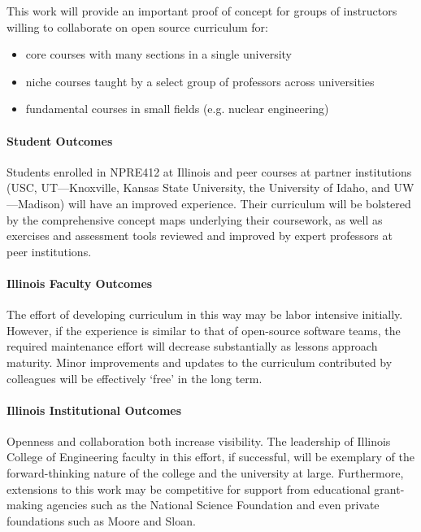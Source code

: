 \documentclass[11pt]{article}
\begin{document}
          This work will provide an important proof of concept for groups of 
          instructors willing to collaborate on open source curriculum for:
          \begin{itemize}
                  \item core courses with many sections in a single university
                  \item niche courses taught by a select group of professors across 
          universities
                  \item fundamental courses in small fields (e.g. nuclear engineering)
          \end{itemize}

          \paragraph{Student Outcomes}
          Students enrolled in NPRE412 at Illinois and peer courses at partner 
          institutions (USC, UT---Knoxville, Kansas State University, the 
          University of Idaho, and UW---Madison) will have an improved 
          experience. Their 
          curriculum will be bolstered by the comprehensive concept maps 
          underlying their coursework\cite{novak_concept_1990}, as well as exercises 
          and assessment tools reviewed and improved by expert professors at 
          peer institutions. 

          \paragraph{Illinois Faculty Outcomes}
          The effort of developing curriculum in this way may be labor 
          intensive initially. However, if the experience is similar to that of 
          open-source software teams, the required maintenance effort will decrease 
          substantially as lessons approach maturity. Minor improvements and updates
          to the curriculum contributed by colleagues will be effectively `free'
          in the long term. 

          \paragraph{Illinois Institutional Outcomes} Openness and collaboration 
          both increase visibility. The leadership of Illinois College of 
          Engineering faculty in this effort, if successful, will be exemplary 
          of the forward-thinking nature of the college and the university at 
          large. Furthermore, extensions to this work may be competitive for  
          support from educational grant-making agencies such as the National 
          Science Foundation and even private foundations such as Moore and 
          Sloan. 
\end{document}
